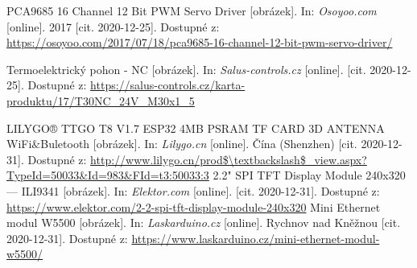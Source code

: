 \begin{thebibliography}{3}
PCA9685 16 Channel 12 Bit PWM Servo Driver [obrázek]. In: \textit{Osoyoo.com} [online]. 2017 [cit. 2020-12-25]. Dostupné z: \url{https://osoyoo.com/2017/07/18/pca9685-16-channel-12-bit-pwm-servo-driver/}

Termoelektrický pohon - NC [obrázek]. In: \textit{Salus-controls.cz} [online]. [cit. 2020-12-25]. Dostupné z: \url{https://salus-controls.cz/karta-produktu/17/T30NC\_24V\_M30x1\_5}

LILYGO® TTGO T8 V1.7 ESP32 4MB PSRAM TF CARD 3D ANTENNA WiFi$\&$Buletooth [obrázek]. In: \textit{Lilygo.cn} [online]. Čína (Shenzhen) [cit. 2020-12-31]. Dostupné z: \url{http://www.lilygo.cn/prod$\textbackslash$_view.aspx?TypeId=50033&Id=983&FId=t3:50033:3}
2.2" SPI TFT Display Module 240x320 --- ILI9341 [obrázek]. In: \textit{Elektor.com} [online]. [cit. 2020-12-31]. Dostupné z: \url{https://www.elektor.com/2-2-spi-tft-display-module-240x320}
Mini Ethernet modul W5500 [obrázek]. In: \textit{Laskarduino.cz} [online]. Rychnov nad Kněžnou [cit. 2020-12-31]. Dostupné z: \url{https://www.laskarduino.cz/mini-ethernet-modul-w5500/}









\end{thebibliography}
